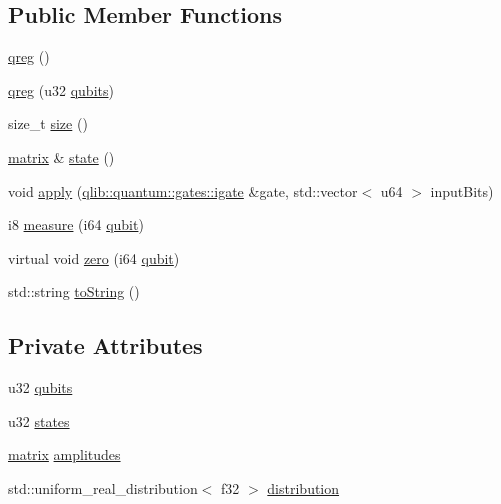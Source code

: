\subsection*{Public Member Functions}
\begin{DoxyCompactItemize}
\item 
\hyperlink{classqlib_1_1quantum_1_1qreg_aa53d83236917f0048965b487088aacb9}{qreg} ()
\item 
\hyperlink{classqlib_1_1quantum_1_1qreg_a2ddfaef9a369571c9600c4c259fcb8b1}{qreg} (u32 \hyperlink{classqlib_1_1quantum_1_1qreg_a2d7c33e71a77d860d50d53a258a71a6f}{qubits})
\item 
size\+\_\+t \hyperlink{classqlib_1_1quantum_1_1qreg_a3148742b59865d0ba04fdd327fccc048}{size} ()
\item 
\hyperlink{classqlib_1_1math_1_1matrix}{matrix} \& \hyperlink{classqlib_1_1quantum_1_1qreg_a20d1b0906eb00ff7d4e1c23449de61a1}{state} ()
\item 
void \hyperlink{classqlib_1_1quantum_1_1qreg_af38f95ecaaf7de400856094154343cfe}{apply} (\hyperlink{classqlib_1_1quantum_1_1gates_1_1igate}{qlib\+::quantum\+::gates\+::igate} \&gate, std\+::vector$<$ u64 $>$ input\+Bits)
\item 
i8 \hyperlink{classqlib_1_1quantum_1_1qreg_acfcd58502c1e511766ede52a891f27c3}{measure} (i64 \hyperlink{classqlib_1_1quantum_1_1qubit}{qubit})
\item 
virtual void \hyperlink{classqlib_1_1quantum_1_1qreg_a51eb9abfde64d764ca2afa27666df0e1}{zero} (i64 \hyperlink{classqlib_1_1quantum_1_1qubit}{qubit})
\item 
std\+::string \hyperlink{classqlib_1_1quantum_1_1qreg_ae4dbf316bf6452f3110cb05146f54954}{to\+String} ()
\end{DoxyCompactItemize}
\subsection*{Private Attributes}
\begin{DoxyCompactItemize}
\item 
u32 \hyperlink{classqlib_1_1quantum_1_1qreg_a2d7c33e71a77d860d50d53a258a71a6f}{qubits}
\item 
u32 \hyperlink{classqlib_1_1quantum_1_1qreg_ad0e84b959f93f3da6ed81eb096f809d1}{states}
\item 
\hyperlink{classqlib_1_1math_1_1matrix}{matrix} \hyperlink{classqlib_1_1quantum_1_1qreg_a1a7e244ee72b78b9c5a8763efad57ada}{amplitudes}
\item 
std\+::uniform\+\_\+real\+\_\+distribution$<$ f32 $>$ \hyperlink{classqlib_1_1quantum_1_1qreg_aabd605497170f57cdbb175d21c99662e}{distribution}
\end{DoxyCompactItemize}


